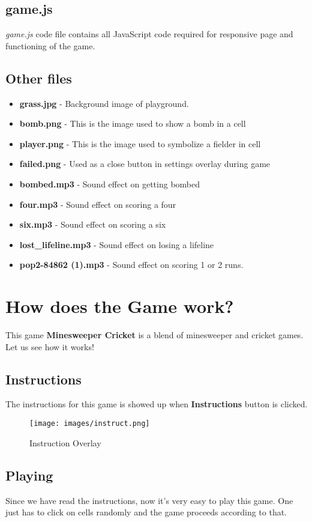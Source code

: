 \documentclass{article}
\begin{document}
\subsection{game.js}
\textit{game.js} code file contains all JavaScript code required for responsive page and functioning of the game.
\subsection{Other files}
\begin{itemize}
    \item \textbf{grass.jpg} - Background image of playground.
    \item \textbf{bomb.png} - This is the image used to show a bomb in a cell
    \item \textbf{player.png} - This is the image used to symbolize a fielder in cell
    \item \textbf{failed.png} - Used as a close button in settings overlay during game
    \item \textbf{bombed.mp3} - Sound effect on getting bombed
    \item \textbf{four.mp3} - Sound effect on scoring a four
    \item \textbf{six.mp3} - Sound effect on scoring a six
    \item \textbf{lost\_lifeline.mp3} - Sound effect on losing a lifeline
    \item \textbf{pop2-84862 (1).mp3} - Sound effect on scoring 1 or 2 runs.
    
\end{itemize}
\section{How does the Game work?}
This game \textbf{Minesweeper Cricket} is a blend of minesweeper and cricket games. Let us see how it works!
\subsection{Instructions}
The instructions for this game is showed up when \textbf{Instructions} button is clicked. 
\begin{figure}[h]
    \centering
    \texttt{[image: images/instruct.png]}
    \caption{Instruction Overlay}
    \label{fig:enter-label}
\end{figure}
\subsection{Playing}
Since we have read the instructions, now it's very easy to play this game. One just has to click on cells randomly and the game proceeds according to that.
\end{document}
